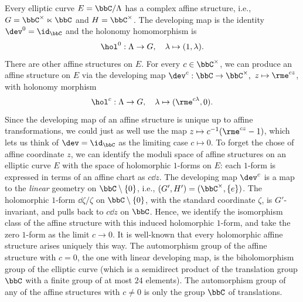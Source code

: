 \begin{example}
    Every elliptic curve $E=\bbC\slash\Lambda$ has a complex affine structure, i.e., $G=\bbC^\times\ltimes\bbC$ and $H=\bbC^\times$. The developing map is the identity $\dev^0=\id_\bbC$ and the holonomy homomorphism is 
    \[\hol^0:\Lambda\to G,\quad \lambda\mapsto (1,\lambda).\]
    There are other affine structures on $E$. For every $c\in \bbC^\times$, we can produce an affine structure on $E$ via the developing map $\dev^c:\bbC\to \bbC^\times,$ $z\mapsto \rme^{cz}$, with holonomy morphism 
    \[\hol^c:\Lambda\to G,\quad \lambda\mapsto (\rme^{c\lambda},0).\]
    Since the developing map of an affine structure is unique up to affine transformations, we could just as well use the map $z\mapsto c^{-1}(\rme^{cz}-1)$, which lets us think of $\dev=\id_\bbC$ as the limiting case $c\mapsto 0$.  To forget the chose of affine coordinate $z$, we can identify the moduli space of affine structures on an elliptic curve $E$ with the space of holomorphic $1$-forms on $E$: each $1$-form is expressed in terms of an affine chart as $c\dd z$. The developing map $\dev^c$ is a map to the \emph{linear} geometry on $\bbC\setminus\{0\}$, i.e., $(G',H')=(\bbC^\times,\{e\})$.  The holomorphic $1$-form $\dd\zeta/\zeta$ on $\bbC\setminus\{0\}$, with the standard coordinate $\zeta$, is $G'$-invariant, and pulls back to $c\dd z$ on $\bbC$. Hence, we identify the isomorphism class of the affine structure with this induced holomorphic $1$-form, and take the zero $1$-form as the limit $c\to 0$.  It is well-known that every holomorphic affine structure arises uniquely this way. The automorphism group of the affine structure with $c=0$, the one with linear developing map, is the biholomorphism group of the elliptic curve (which is a semidirect product of the translation group $\bbC$ with a finite group of at most $24$ elements). The automorphism group of any of the affine structures with $c\neq 0$ is only the group $\bbC$ of translations.
\end{example}

